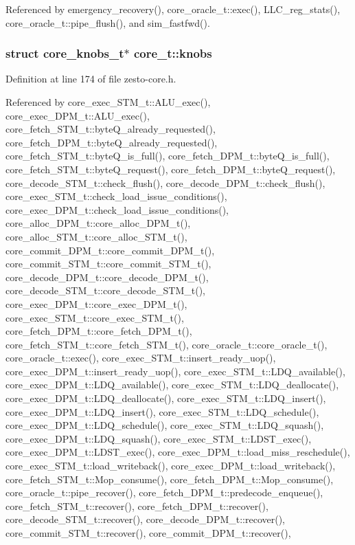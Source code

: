 Referenced by emergency\_\-recovery(), core\_\-oracle\_\-t::exec(), LLC\_\-reg\_\-stats(), core\_\-oracle\_\-t::pipe\_\-flush(), and sim\_\-fastfwd().
\subsubsection[{knobs}]{\setlength{\rightskip}{0pt plus 5cm}struct {\bf core\_\-knobs\_\-t}$\ast$ {\bf core\_\-t::knobs}\hspace{0.3cm}{\tt  [read]}}\label{classcore__t_a397a3f36f045e3c2a19dafc16dab1c1}




Definition at line 174 of file zesto-core.h.

Referenced by core\_\-exec\_\-STM\_\-t::ALU\_\-exec(), core\_\-exec\_\-DPM\_\-t::ALU\_\-exec(), core\_\-fetch\_\-STM\_\-t::byteQ\_\-already\_\-requested(), core\_\-fetch\_\-DPM\_\-t::byteQ\_\-already\_\-requested(), core\_\-fetch\_\-STM\_\-t::byteQ\_\-is\_\-full(), core\_\-fetch\_\-DPM\_\-t::byteQ\_\-is\_\-full(), core\_\-fetch\_\-STM\_\-t::byteQ\_\-request(), core\_\-fetch\_\-DPM\_\-t::byteQ\_\-request(), core\_\-decode\_\-STM\_\-t::check\_\-flush(), core\_\-decode\_\-DPM\_\-t::check\_\-flush(), core\_\-exec\_\-STM\_\-t::check\_\-load\_\-issue\_\-conditions(), core\_\-exec\_\-DPM\_\-t::check\_\-load\_\-issue\_\-conditions(), core\_\-alloc\_\-DPM\_\-t::core\_\-alloc\_\-DPM\_\-t(), core\_\-alloc\_\-STM\_\-t::core\_\-alloc\_\-STM\_\-t(), core\_\-commit\_\-DPM\_\-t::core\_\-commit\_\-DPM\_\-t(), core\_\-commit\_\-STM\_\-t::core\_\-commit\_\-STM\_\-t(), core\_\-decode\_\-DPM\_\-t::core\_\-decode\_\-DPM\_\-t(), core\_\-decode\_\-STM\_\-t::core\_\-decode\_\-STM\_\-t(), core\_\-exec\_\-DPM\_\-t::core\_\-exec\_\-DPM\_\-t(), core\_\-exec\_\-STM\_\-t::core\_\-exec\_\-STM\_\-t(), core\_\-fetch\_\-DPM\_\-t::core\_\-fetch\_\-DPM\_\-t(), core\_\-fetch\_\-STM\_\-t::core\_\-fetch\_\-STM\_\-t(), core\_\-oracle\_\-t::core\_\-oracle\_\-t(), core\_\-oracle\_\-t::exec(), core\_\-exec\_\-STM\_\-t::insert\_\-ready\_\-uop(), core\_\-exec\_\-DPM\_\-t::insert\_\-ready\_\-uop(), core\_\-exec\_\-STM\_\-t::LDQ\_\-available(), core\_\-exec\_\-DPM\_\-t::LDQ\_\-available(), core\_\-exec\_\-STM\_\-t::LDQ\_\-deallocate(), core\_\-exec\_\-DPM\_\-t::LDQ\_\-deallocate(), core\_\-exec\_\-STM\_\-t::LDQ\_\-insert(), core\_\-exec\_\-DPM\_\-t::LDQ\_\-insert(), core\_\-exec\_\-STM\_\-t::LDQ\_\-schedule(), core\_\-exec\_\-DPM\_\-t::LDQ\_\-schedule(), core\_\-exec\_\-STM\_\-t::LDQ\_\-squash(), core\_\-exec\_\-DPM\_\-t::LDQ\_\-squash(), core\_\-exec\_\-STM\_\-t::LDST\_\-exec(), core\_\-exec\_\-DPM\_\-t::LDST\_\-exec(), core\_\-exec\_\-DPM\_\-t::load\_\-miss\_\-reschedule(), core\_\-exec\_\-STM\_\-t::load\_\-writeback(), core\_\-exec\_\-DPM\_\-t::load\_\-writeback(), core\_\-fetch\_\-STM\_\-t::Mop\_\-consume(), core\_\-fetch\_\-DPM\_\-t::Mop\_\-consume(), core\_\-oracle\_\-t::pipe\_\-recover(), core\_\-fetch\_\-DPM\_\-t::predecode\_\-enqueue(), core\_\-fetch\_\-STM\_\-t::recover(), core\_\-fetch\_\-DPM\_\-t::recover(), core\_\-decode\_\-STM\_\-t::recover(), core\_\-decode\_\-DPM\_\-t::recover(), core\_\-commit\_\-STM\_\-t::recover(), core\_\-commit\_\-DPM\_\-t::recover(), 